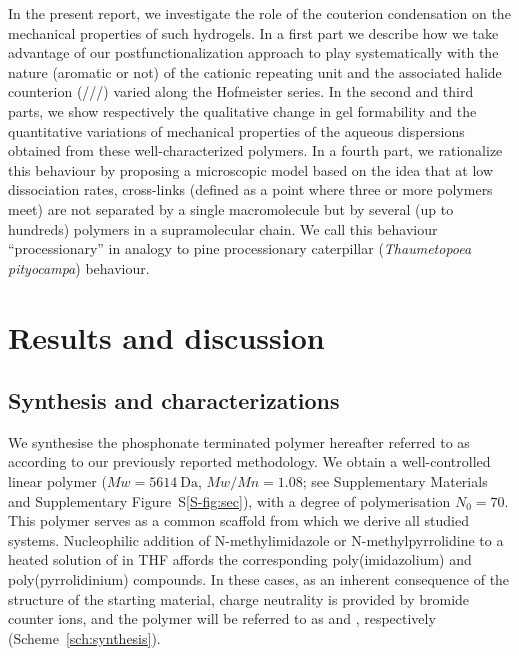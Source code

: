 \documentclass[journal=jacsat,manuscript=article]{achemso}
\begin{document}
In the present report, we investigate the role of the couterion condensation on the mechanical properties of such hydrogels. In a first part we describe how we take advantage of our postfunctionalization approach to play systematically with the nature (aromatic or not) of the cationic repeating unit and the associated halide counterion (///) varied along the Hofmeister series. In the second and third parts, we show respectively the qualitative change in gel formability and the quantitative variations of mechanical properties of the aqueous dispersions obtained from these well-characterized polymers. In a fourth part, we rationalize this behaviour by proposing a microscopic model based on the idea that at low dissociation rates, cross-links (defined as a point where three or more polymers meet) are not separated by a single macromolecule but by several (up to hundreds) polymers in a supramolecular chain. We call this behaviour ``processionary'' in analogy to pine processionary caterpillar (\textit{Thaumetopoea pityocampa}) behaviour\cite{Fabre1916}.%

\section{Results and discussion}

\subsection{Synthesis and characterizations}

We synthesise the phosphonate terminated polymer hereafter referred to as  according to our previously reported methodology\cite{Srour2014,Appukuttan2012}. We obtain a well-controlled linear polymer ($Mw= \SI{5614}{\dalton}$, $Mw/Mn = 1.08$; see Supplementary Materials and Supplementary Figure~S\ref{S-fig:sec}), with a degree of polymerisation $N_0=70$. This polymer serves as a common scaffold from which we derive  all studied systems. Nucleophilic addition of N-methylimidazole or N-methylpyrrolidine to a heated solution of  in THF affords the corresponding poly(imidazolium) and poly(pyrrolidinium) compounds. In these cases, as an inherent consequence of the structure of the starting material, charge neutrality is provided by bromide counter ions, and the polymer will be referred to as  and , respectively (Scheme~\ref{sch:synthesis}).
\end{document}
